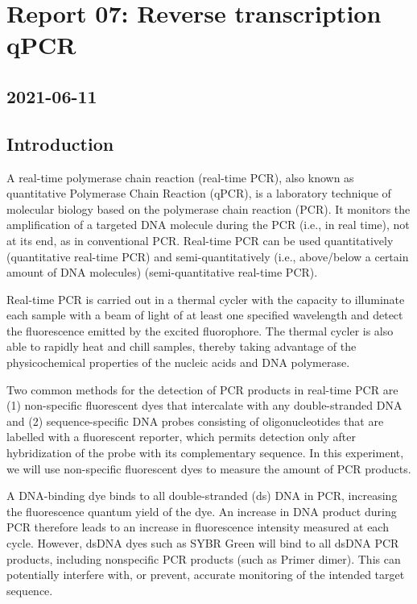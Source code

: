 \newpage
\section{Report 07: Reverse transcription qPCR}

\subsection*{2021-06-11}


\subsection{Introduction}
A real-time polymerase chain reaction (real-time PCR), also known as quantitative Polymerase Chain Reaction (qPCR), is a laboratory technique of molecular biology based on the polymerase chain reaction (PCR). It monitors the amplification of a targeted DNA molecule during the PCR (i.e., in real time), not at its end, as in conventional PCR. Real-time PCR can be used quantitatively (quantitative real-time PCR) and semi-quantitatively (i.e., above/below a certain amount of DNA molecules) (semi-quantitative real-time PCR).
		
		Real-time PCR is carried out in a thermal cycler with the capacity to illuminate each sample with a beam of light of at least one specified wavelength and detect the fluorescence emitted by the excited fluorophore. The thermal cycler is also able to rapidly heat and chill samples, thereby taking advantage of the physicochemical properties of the nucleic acids and DNA polymerase.
		
		Two common methods for the detection of PCR products in real-time PCR are (1) non-specific fluorescent dyes that intercalate with any double-stranded DNA and (2) sequence-specific DNA probes consisting of oligonucleotides that are labelled with a fluorescent reporter, which permits detection only after hybridization of the probe with its complementary sequence. In this experiment, we will use non-specific fluorescent dyes to measure the amount of PCR products.
		
		A DNA-binding dye binds to all double-stranded (ds) DNA in PCR, increasing the fluorescence quantum yield of the dye. An increase in DNA product during PCR therefore leads to an increase in fluorescence intensity measured at each cycle. However, dsDNA dyes such as SYBR Green will bind to all dsDNA PCR products, including nonspecific PCR products (such as Primer dimer). This can potentially interfere with, or prevent, accurate monitoring of the intended target sequence.
		
